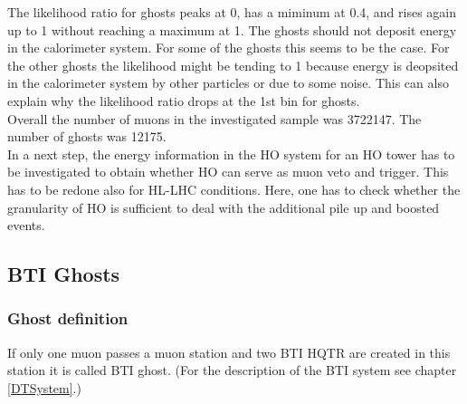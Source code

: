 The likelihood ratio for ghosts peaks at 0, has a miminum at 0.4, and rises again up to 1 without reaching a maximum at 1. The ghosts should not deposit energy in the calorimeter system. For some of the ghosts this seems to be the case. For the other ghosts the likelihood might be tending to 1 because energy is deopsited in the calorimeter system by other particles or due to some noise. This can also explain why the likelihood ratio drops at the 1st bin for ghosts.\\
Overall the number of muons in the investigated sample was 3722147. The number of ghosts was 12175.\\
In a next step, the energy information in the HO system for an HO tower has to be investigated to obtain whether HO can serve as muon veto and trigger. This has to be redone also for HL-LHC conditions. Here, one has to check whether the granularity of HO is sufficient to deal with the additional pile up and boosted events.\\
\subsection{BTI Ghosts}
\subsubsection{Ghost definition}
If only one muon passes a muon station and two BTI HQTR are created in this station it is called BTI ghost. (For the description of the BTI system see chapter \ref{DTSystem}.)
